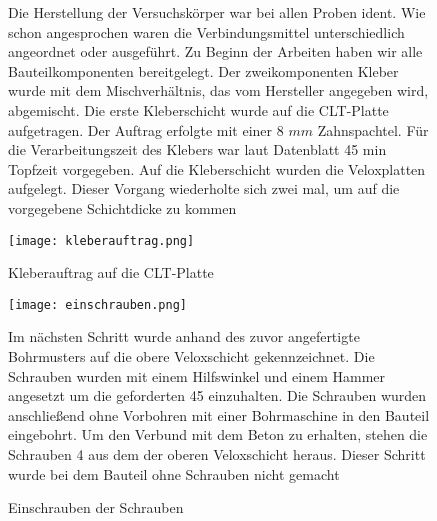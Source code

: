 \documentclass[12 pt,a4 paper ]{scrreprt}
\begin{document}
\begin{figure}[h!]
	\begin{minipage}[h]{7cm}	
	 Die Herstellung der Versuchskörper war bei allen Proben ident. Wie schon angesprochen 	waren die Verbindungsmittel unterschiedlich angeordnet oder ausgeführt.
	Zu Beginn der Arbeiten haben wir alle Bauteilkomponenten bereitgelegt. Der 					zweikomponenten Kleber wurde mit dem Mischverhältnis, das vom Hersteller angegeben 			wird, abgemischt. Die erste Kleberschicht wurde auf die CLT-Platte aufgetragen. Der 		Auftrag erfolgte mit einer  8 $mm$ Zahnspachtel. Für die Verarbeitungszeit des Klebers 		war laut Datenblatt 45 min Topfzeit vorgegeben. Auf die Kleberschicht wurden die 			Veloxplatten aufgelegt. Dieser Vorgang wiederholte sich zwei mal, um auf die 				vorgegebene Schichtdicke zu kommen
	\end{minipage}
		\hfill
	\begin{minipage}[h]{7cm}
		\texttt{[image: kleberauftrag.png]}
			\caption{Kleberauftrag auf die CLT-Platte}
			\label{kleberauftrag}
	\end{minipage}
\end{figure}



\begin{figure}[h!]
\begin{minipage}[h]{7cm}
	\texttt{[image: einschrauben.png]}
	\caption{Einschrauben der Schrauben}
	\label{einschrauben}
\end{minipage}
\hfill
\begin{minipage}[h]{7cm}
Im nächsten Schritt wurde anhand des zuvor angefertigte Bohrmusters auf die obere Veloxschicht gekennzeichnet. Die Schrauben wurden mit einem Hilfswinkel und einem Hammer angesetzt um die geforderten 45 einzuhalten. Die Schrauben wurden anschließend ohne Vorbohren mit einer Bohrmaschine in den Bauteil eingebohrt. Um den Verbund mit dem Beton zu erhalten, stehen die  Schrauben 4 aus dem der oberen Veloxschicht heraus. Dieser Schritt wurde bei dem Bauteil ohne Schrauben nicht gemacht
	
\end{minipage}
\end{figure}
\end{document}
